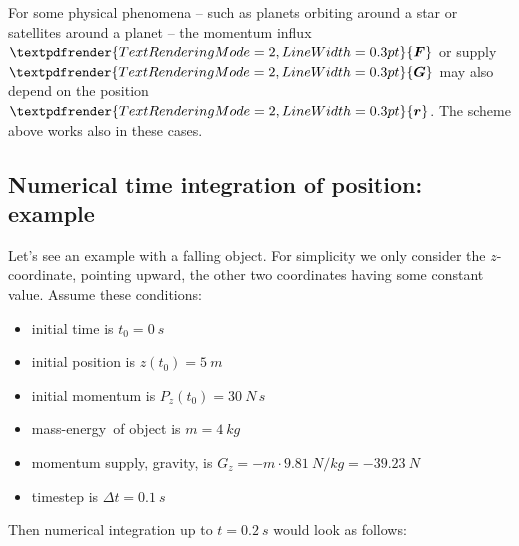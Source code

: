 \documentclass[a4paper,12pt,%
onecolumn,oneside,titlepage,%
british%
]{memoir}
\renewcommand*{\bm}[1]{\textpdfrender{TextRenderingMode=2,LineWidth=0.3pt}{\boldsymbol{#1}}}
\newcommand*{\incr}{\Delta}%
\renewcommand*{\|}[1][]{\nonscript\:#1\vert\nonscript\:\mathopen{}}
\newcommand*{\yr}{\bm{r}}
\newcommand*{\yM}{m}%
\newcommand*{\yF}{\bm{F}}
\newcommand*{\yG}{\bm{G}}
\newcommand*{\yti}{t_{0}}
\newcommand*{\Dt}{\incr t}
\newcommand*{\masse}{mass-energy}
\begin{document}
For some physical phenomena -- such as planets orbiting around a star or satellites around a planet -- the momentum influx $\yF$ or supply $\yG$ may also depend on the position $\yr$. The scheme above works also in these cases.

\subsection{Numerical time integration of position: example}
\label{sec:example_falling_object_timestep}

Let's see an example with a falling object. For simplicity we only consider the $z$-coordinate, pointing upward, the other two coordinates having some constant value. Assume these conditions:
\begin{itemize}[nosep]
\item initial time is $\yti=\qty{0}{s}$
\item initial position is $z(\yti)=\qty{5}{m}$
\item initial momentum is $P_{z}(\yti)=\qty{30}{N\,s}$
\item \masse\ of object is $\yM=\qty{4}{kg}$
\item momentum supply, gravity, is $G_{z}=-\yM\cdot\qty{9.81}{N/kg} = \qty{-39.23}{N}$
\item timestep is $\Dt = \qty{0.1}{s}$
\end{itemize}
Then numerical integration up to $t=\qty{0.2}{s}$ would look as follows:\noprelistbreak
\end{document}
